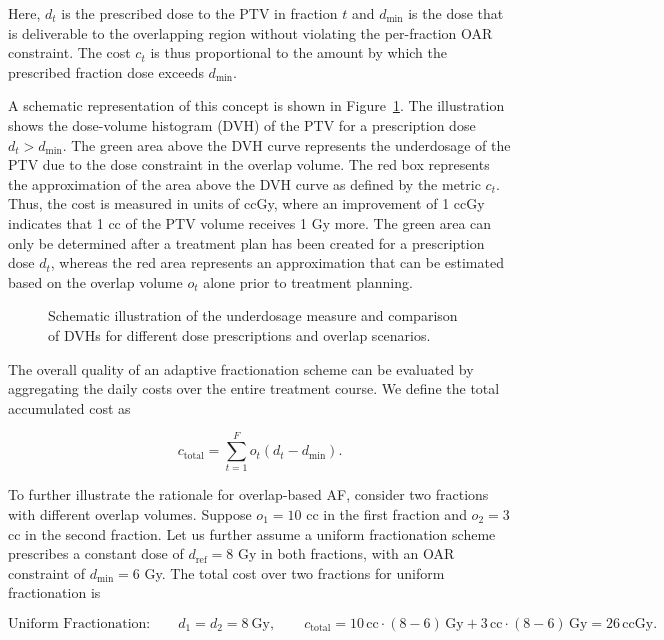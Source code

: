 \documentclass[11pt]{article}
\begin{document}
Here, $d_t$ is the prescribed dose to the PTV in fraction $t$ and $d_{\min}$ is the dose that is deliverable to the overlapping region without violating the per-fraction OAR constraint. The cost $c_t$ is thus proportional to the amount by which the prescribed fraction dose exceeds $d_{\min}$.

A schematic representation of this concept is shown in Figure~\ref{fig:dvh-schematic}. The illustration shows the dose-volume histogram (DVH) of the PTV for a prescription dose $d_t > d_{\min}$. The green area above the DVH curve represents the underdosage of the PTV due to the dose constraint in the overlap volume. The red box represents the approximation of the area above the DVH curve as defined by the metric $c_t$. Thus, the cost is measured in units of ccGy, where an improvement of 1 ccGy indicates that 1 cc of the PTV volume receives 1 Gy more. The green area can only be determined after a treatment plan has been created for a prescription dose $d_t$, whereas the red area represents an approximation that can be estimated based on the overlap volume $o_t$ alone prior to treatment planning.

\begin{figure}[ht]
\centering
{}
\caption{Schematic illustration of the underdosage measure and comparison of DVHs for different dose prescriptions and overlap scenarios.}
\label{fig:dvh-schematic}
\end{figure}

The overall quality of an adaptive fractionation scheme can be evaluated by aggregating the daily costs over the entire treatment course. We define the total accumulated cost as

\begin{equation}
c_{\mathrm{total}} = \sum_{t=1}^{F} o_t (d_t - d_{\min}).
\label{eq:total-cost}
\end{equation}

To further illustrate the rationale for overlap-based AF, consider two fractions with different overlap volumes. Suppose $o_1 = 10$ cc in the first fraction and $o_2 = 3$ cc in the second fraction. Let us further assume a uniform fractionation scheme prescribes a constant dose of $d_{\mathrm{ref}} = 8$ Gy in both fractions, with an OAR constraint of $d_{\min}=6$ Gy. The total cost over two fractions for uniform fractionation is

\[
\text{Uniform Fractionation:}\qquad d_1 = d_2 = 8~\mathrm{Gy}, \qquad
c_{\mathrm{total}} = 10\,\mathrm{cc}\cdot(8-6)\,\mathrm{Gy} + 3\,\mathrm{cc}\cdot(8-6)\,\mathrm{Gy} = 26\,\mathrm{ccGy}.
\]
\end{document}
